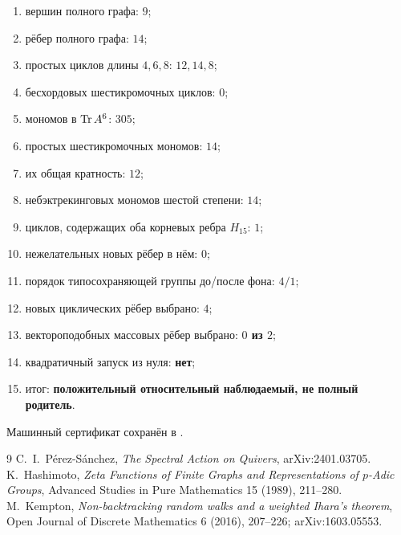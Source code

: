 \begin{protocol}
\begin{enumerate}
 \item вершин полного графа: \textbf{$9$};
 \item рёбер полного графа: \textbf{$14$};
 \item простых циклов длины $4,6,8$: \textbf{$12,14,8$};
 \item бесхордовых шестикромочных циклов: \textbf{$0$};
 \item мономов в $\operatorname{Tr} A^6$: \textbf{$305$};
 \item простых шестикромочных мономов: \textbf{$14$};
 \item их общая кратность: \textbf{$12$};
 \item небэктрекинговых мономов шестой степени: \textbf{$14$};
 \item циклов, содержащих оба корневых ребра $H_{15}$: \textbf{$1$};
 \item нежелательных новых рёбер в нём: \textbf{$0$};
 \item порядок типосохраняющей группы до/после фона: \textbf{$4/1$};
 \item новых циклических рёбер выбрано: \textbf{$4$};
 \item вектороподобных массовых рёбер выбрано: \textbf{$0$ из $2$};
 \item квадратичный запуск из нуля: \textbf{нет};
 \item итог: \textbf{положительный относительный наблюдаемый, не полный
 родитель}.
\end{enumerate}
\end{protocol}

Машинный сертификат сохранён в
.

\begin{thebibliography}{9}
C.~I.~P\'erez-S\'anchez,
\emph{The Spectral Action on Quivers}, arXiv:2401.03705.
K.~Hashimoto,
\emph{Zeta Functions of Finite Graphs and Representations of
$p$-Adic Groups}, Advanced Studies in Pure Mathematics 15 (1989),
211--280.
M.~Kempton,
\emph{Non-backtracking random walks and a weighted Ihara's theorem},
Open Journal of Discrete Mathematics 6 (2016), 207--226;
arXiv:1603.05553.
\end{thebibliography}